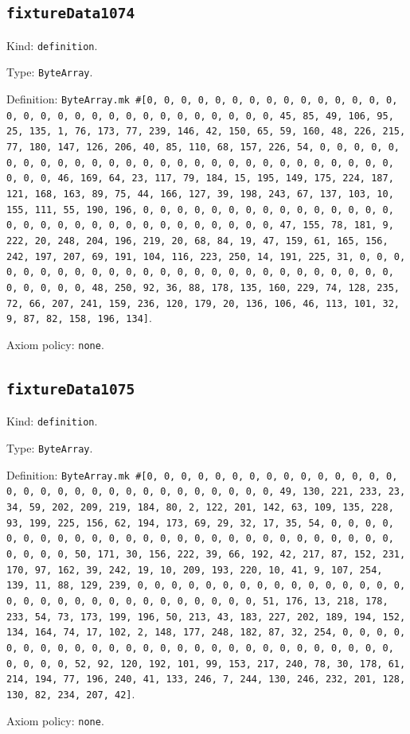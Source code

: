 \documentclass[11pt]{article}
\begin{document}
\subsection*{\texttt{fixtureData1074}}
\noindent Kind: \texttt{definition}.\par
\noindent Type: \texttt{ByteArray}.\par
\noindent Definition: \texttt{ByteArray.mk \#[0, 0, 0, 0, 0, 0, 0, 0, 0, 0, 0, 0, 0, 0, 0, 0, 0, 0, 0, 0, 0, 0, 0, 0, 0, 0, 0, 0, 0, 0, 0, 45, 85, 49, 106, 95, 25, 135, 1, 76, 173, 77, 239, 146, 42, 150, 65, 59, 160, 48, 226, 215, 77, 180, 147, 126, 206, 40, 85, 110, 68, 157, 226, 54, 0, 0, 0, 0, 0, 0, 0, 0, 0, 0, 0, 0, 0, 0, 0, 0, 0, 0, 0, 0, 0, 0, 0, 0, 0, 0, 0, 0, 0, 0, 0, 46, 169, 64, 23, 117, 79, 184, 15, 195, 149, 175, 224, 187, 121, 168, 163, 89, 75, 44, 166, 127, 39, 198, 243, 67, 137, 103, 10, 155, 111, 55, 190, 196, 0, 0, 0, 0, 0, 0, 0, 0, 0, 0, 0, 0, 0, 0, 0, 0, 0, 0, 0, 0, 0, 0, 0, 0, 0, 0, 0, 0, 0, 0, 0, 47, 155, 78, 181, 9, 222, 20, 248, 204, 196, 219, 20, 68, 84, 19, 47, 159, 61, 165, 156, 242, 197, 207, 69, 191, 104, 116, 223, 250, 14, 191, 225, 31, 0, 0, 0, 0, 0, 0, 0, 0, 0, 0, 0, 0, 0, 0, 0, 0, 0, 0, 0, 0, 0, 0, 0, 0, 0, 0, 0, 0, 0, 0, 0, 48, 250, 92, 36, 88, 178, 135, 160, 229, 74, 128, 235, 72, 66, 207, 241, 159, 236, 120, 179, 20, 136, 106, 46, 113, 101, 32, 9, 87, 82, 158, 196, 134]}.\par
\noindent Axiom policy: \texttt{none}.\par
\subsection*{\texttt{fixtureData1075}}
\noindent Kind: \texttt{definition}.\par
\noindent Type: \texttt{ByteArray}.\par
\noindent Definition: \texttt{ByteArray.mk \#[0, 0, 0, 0, 0, 0, 0, 0, 0, 0, 0, 0, 0, 0, 0, 0, 0, 0, 0, 0, 0, 0, 0, 0, 0, 0, 0, 0, 0, 0, 0, 49, 130, 221, 233, 23, 34, 59, 202, 209, 219, 184, 80, 2, 122, 201, 142, 63, 109, 135, 228, 93, 199, 225, 156, 62, 194, 173, 69, 29, 32, 17, 35, 54, 0, 0, 0, 0, 0, 0, 0, 0, 0, 0, 0, 0, 0, 0, 0, 0, 0, 0, 0, 0, 0, 0, 0, 0, 0, 0, 0, 0, 0, 0, 0, 50, 171, 30, 156, 222, 39, 66, 192, 42, 217, 87, 152, 231, 170, 97, 162, 39, 242, 19, 10, 209, 193, 220, 10, 41, 9, 107, 254, 139, 11, 88, 129, 239, 0, 0, 0, 0, 0, 0, 0, 0, 0, 0, 0, 0, 0, 0, 0, 0, 0, 0, 0, 0, 0, 0, 0, 0, 0, 0, 0, 0, 0, 0, 0, 51, 176, 13, 218, 178, 233, 54, 73, 173, 199, 196, 50, 213, 43, 183, 227, 202, 189, 194, 152, 134, 164, 74, 17, 102, 2, 148, 177, 248, 182, 87, 32, 254, 0, 0, 0, 0, 0, 0, 0, 0, 0, 0, 0, 0, 0, 0, 0, 0, 0, 0, 0, 0, 0, 0, 0, 0, 0, 0, 0, 0, 0, 0, 0, 52, 92, 120, 192, 101, 99, 153, 217, 240, 78, 30, 178, 61, 214, 194, 77, 196, 240, 41, 133, 246, 7, 244, 130, 246, 232, 201, 128, 130, 82, 234, 207, 42]}.\par
\noindent Axiom policy: \texttt{none}.\par
\end{document}
